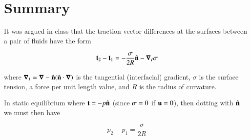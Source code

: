 \section{Summary}
%
%
%
%
%
%


It was argued in class that the traction vector differences at the surfaces between a pair of fluids have the form

\begin{equation}\label{eqn:continuumFluidsReview:2090}
\mathbf{t}_2 - \mathbf{t}_1 = -\frac{\sigma}{2 R} \hat{\mathbf{n}} - \boldsymbol{\nabla}_I \sigma
\end{equation}

where $\boldsymbol{\nabla}_I = \boldsymbol{\nabla} - \hat{\mathbf{n}} (\hat{\mathbf{n}} \cdot \boldsymbol{\nabla})$ is the tangential (interfacial) gradient, $\sigma$ is the surface tension, a force per unit length value, and $R$ is the radius of curvature.

In static equilibrium where $\mathbf{t} = -p \hat{\mathbf{n}}$ (since $\boldsymbol{\sigma} = 0$ if $\mathbf{u} = 0$), then dotting with $\hat{\mathbf{n}}$ we must then have

\begin{equation}\label{eqn:continuumFluidsReview:2110}
p_2 - p_1 = \frac{\sigma}{2 R} 
\end{equation}

